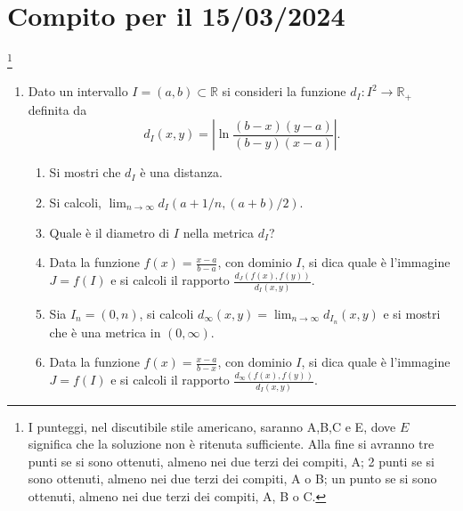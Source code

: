 \documentclass{report}
\newcommand\bR{{\mathbb R}}
\begin{document}
\section*{Compito per il 15/03/2024}\footnote{ I punteggi, nel discutibile stile americano, saranno A,B,C e E, dove $E$ significa che  la soluzione non è ritenuta sufficiente. Alla fine si avranno tre punti se si sono ottenuti, almeno nei due terzi dei compiti, A; 2 punti se si sono ottenuti,  almeno nei due terzi dei compiti, A o B; un punto se si sono ottenuti, almeno nei due terzi dei compiti, A, B o C.}
\begin{enumerate}
\item Dato un intervallo $I=(a,b)\subset \bR$ si consideri la funzione $d_I:I^2\to\bR_+$ definita da
\[
d_I(x,y)=\left|\ln\frac{ (b-x)(y-a)}{(b-y)(x-a)}\right|.
\]
\begin{enumerate}
\item Si mostri che $d_I$ è una distanza.
\item Si calcoli,  $\lim_{n\to\infty} d_I(a+1/n, (a+b)/2)$.
\item Quale è il diametro di $I$ nella metrica $d_I$?
\item Data la funzione $f(x)=\frac{x-a}{b-a}$, con dominio $I$, si dica quale è l'immagine $J=f(I)$ e si calcoli il rapporto $\frac{d_J(f(x),f(y))}{d_I(x,y)}$.
\item Sia $I_n=(0,n)$, si calcoli $d_\infty(x,y)=\lim_{n\to\infty}d_{I_n}(x,y)$ e si mostri che è una metrica in $(0,\infty)$.
\item Data la funzione $f(x)=\frac{x-a}{b-x}$, con dominio $I$, si dica quale è l'immagine $J=f(I)$ e si calcoli il rapporto $\frac{d_\infty(f(x),f(y))}{d_I(x,y)}$.
\end{enumerate}
\end{enumerate}
\newpage
\end{document}
